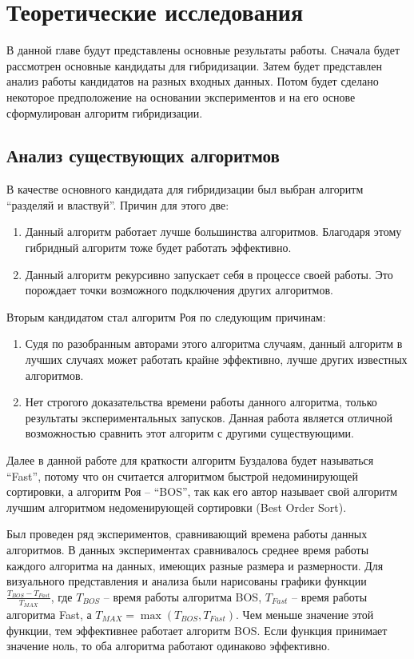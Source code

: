 \chapter{Теоретические исследования}
\label{chapter2}

В данной главе будут представлены основные результаты работы. Сначала будет рассмотрен основные кандидаты для гибридизации. Затем будет представлен анализ работы кандидатов на разных входных данных. Потом будет сделано некоторое предположение на основании экспериментов и на его основе сформулирован алгоритм гибридизации. 

\section{Анализ существующих алгоритмов}

В качестве основного кандидата для гибридизации был выбран алгоритм ``разделяй и властвуй''. Причин для этого две:

\begin{enumerate}
 \item Данный алгоритм работает лучше большинства алгоритмов. Благодаря этому гибридный алгоритм тоже будет работать эффективно.
 \item Данный алгоритм рекурсивно запускает себя в процессе своей работы. Это порождает точки возможного подключения других алгоритмов.
\end{enumerate}

Вторым кандидатом стал алгоритм Роя по следующим причинам:

\begin{enumerate}
 \item Судя по разобранным авторами этого алгоритма случаям, данный алгоритм в лучших случаях может работать крайне эффективно, лучше других известных алгоритмов.
 \item Нет строгого доказательства времени работы данного алгоритма, только результаты экспериментальных запусков. Данная работа является отличной возможностью сравнить этот алгоритм с другими существующими.
\end{enumerate}

Далее в данной работе для краткости алгоритм Буздалова будет называться ``Fast'', потому что он считается алгоритмом быстрой недоминирующей сортировки, а алгоритм Роя -- ``BOS'', так как его автор называет свой алгоритм лучшим алгоритмом недоменирующей сортировки (Best Order Sort).

Был проведен ряд экспериментов, сравнивающий времена работы данных алгоритмов. В данных экспериментах сравнивалось среднее время работы каждого алгоритма на данных, имеющих разные размера и размерности. Для визуального представления и анализа были нарисованы графики функции $\frac{T_{BOS} - T_{Fast}}{T_{MAX}}$, где $T_{BOS}$ -- время работы алгоритма BOS, $T_{Fast}$ -- время работы алгоритма Fast, а $T_{MAX} = \max(T_{BOS}, T_{Fast})$. Чем меньше значение этой функции, тем эффективнее работает алгоритм BOS. Если функция принимает значение ноль, то оба алгоритма работают одинаково эффективно.

